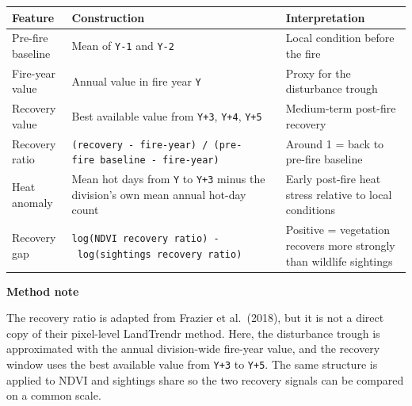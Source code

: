 \documentclass[
  letterpaper,
  DIV=11,
  numbers=noendperiod]{scrartcl}
\begin{document}
\begin{longtable}[]{@{}
  >{\raggedright\arraybackslash}p{}
  >{\raggedright\arraybackslash}p{}
  >{\raggedright\arraybackslash}p{}@{}}
\toprule\noalign{}
\begin{minipage}[b]{\linewidth}\raggedright
Feature
\end{minipage} & \begin{minipage}[b]{\linewidth}\raggedright
Construction
\end{minipage} & \begin{minipage}[b]{\linewidth}\raggedright
Interpretation
\end{minipage} \\
\midrule\noalign{}
\endhead
\bottomrule\noalign{}
\endlastfoot
Pre-fire baseline & Mean of \texttt{Y-1} and \texttt{Y-2} & Local
condition before the fire \\
Fire-year value & Annual value in fire year \texttt{Y} & Proxy for the
disturbance trough \\
Recovery value & Best available value from \texttt{Y+3}, \texttt{Y+4},
\texttt{Y+5} & Medium-term post-fire recovery \\
Recovery ratio &
\texttt{(recovery\ -\ fire-year)\ /\ (pre-fire\ baseline\ -\ fire-year)}
& Around 1 = back to pre-fire baseline \\
Heat anomaly & Mean hot days from \texttt{Y} to \texttt{Y+3} minus the
division's own mean annual hot-day count & Early post-fire heat stress
relative to local conditions \\
Recovery gap &
\texttt{log(NDVI\ recovery\ ratio)\ -\ log(sightings\ recovery\ ratio)}
& Positive = vegetation recovers more strongly than wildlife
sightings \\
\end{longtable}

\begin{tcolorbox}[enhanced jigsaw, left=2mm, opacityback=0, colback=white, breakable, arc=.35mm, bottomrule=.15mm, rightrule=.15mm, toprule=.15mm, colframe=quarto-callout-note-color-frame, leftrule=.75mm]
\begin{minipage}[t]{5.5mm}
\textcolor{quarto-callout-note-color}{\faInfo}
\end{minipage}%
\begin{minipage}[t]{\textwidth - 5.5mm}

\vspace{-3mm}\textbf{Method note}\vspace{3mm}

The recovery ratio is adapted from Frazier et al.~(2018), but it is not
a direct copy of their pixel-level LandTrendr method. Here, the
disturbance trough is approximated with the annual division-wide
fire-year value, and the recovery window uses the best available value
from \texttt{Y+3} to \texttt{Y+5}. The same structure is applied to NDVI
and sightings share so the two recovery signals can be compared on a
common scale.

\end{minipage}%
\end{tcolorbox}
\end{document}

